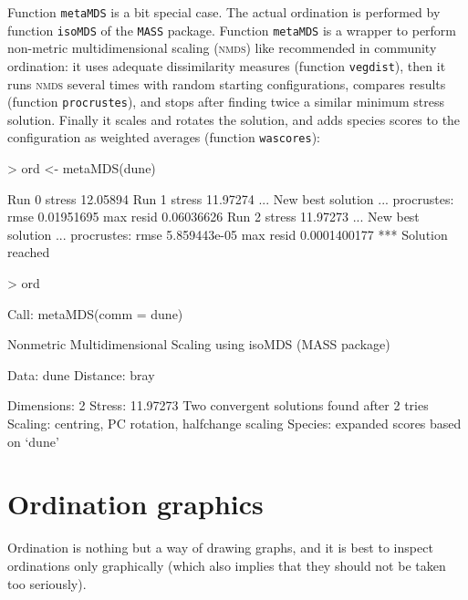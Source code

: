 \documentclass[a4paper,10pt]{amsart}
\begin{document}
Function \texttt{metaMDS} is a bit special case.  The actual
ordination is performed by function \texttt{isoMDS} of the \texttt{MASS}
package.  Function \texttt{metaMDS} is a wrapper to perform non-metric
multidimensional scaling (\textsc{nmds}) like recommended in community
ordination: it uses adequate dissimilarity measures (function
\texttt{vegdist}), then it runs \textsc{nmds} several times with
random starting configurations, compares results (function
\texttt{procrustes}), and stops after finding twice a similar minimum stress
solution.  Finally it scales and rotates the solution, and adds
species scores to the configuration as weighted averages (function
\texttt{wascores}):
\begin{Schunk}
\begin{Sinput}
> ord <- metaMDS(dune)
\end{Sinput}
\begin{Soutput}
Run 0 stress 12.05894 
Run 1 stress 11.97274 
... New best solution
... procrustes: rmse 0.01951695  max resid 0.06036626 
Run 2 stress 11.97273 
... New best solution
... procrustes: rmse 5.859443e-05  max resid 0.0001400177 
*** Solution reached
\end{Soutput}
\begin{Sinput}
> ord
\end{Sinput}
\begin{Soutput}
Call:
metaMDS(comm = dune) 

Nonmetric Multidimensional Scaling using isoMDS (MASS package)

Data:     dune 
Distance: bray 

Dimensions: 2 
Stress:     11.97273 
Two convergent solutions found after 2 tries
Scaling: centring, PC rotation, halfchange scaling 
Species: expanded scores based on ‘dune’ 
\end{Soutput}
\end{Schunk}

\section{Ordination graphics}

Ordination is nothing but a way of drawing graphs, and it is best to
inspect ordinations only graphically (which also implies that they
should not be taken too seriously).
\end{document}
